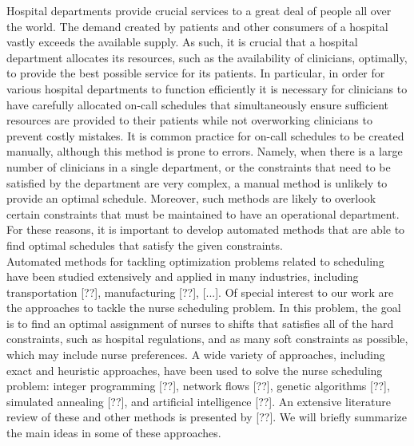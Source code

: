 Hospital departments provide crucial services to a great deal of people all over the world. The demand created by patients and other consumers of a hospital vastly exceeds the available supply. As such, it is crucial that a hospital department allocates its resources, such as the availability of clinicians, optimally, to provide the best possible service for its patients. In particular, in order for various hospital departments to function efficiently it is necessary for clinicians to have carefully allocated on-call schedules that simultaneously ensure sufficient resources are provided to their patients while not overworking clinicians to prevent costly mistakes. It is common practice for on-call schedules to be created manually, although this method is prone to errors. Namely, when there is a large number of clinicians in a single department, or the constraints that need to be satisfied by the department are very complex, a manual method is unlikely to provide an optimal schedule. Moreover, such methods are likely to overlook certain constraints that must be maintained to have an operational department. For these reasons, it is important to develop automated methods that are able to find optimal schedules that satisfy the given constraints. \\


Automated methods for tackling optimization problems related to scheduling have been studied extensively and applied in many industries, including transportation [??], manufacturing [??], [...]. Of special interest to our work are the approaches to tackle the nurse scheduling problem. In this problem, the goal is to find an optimal assignment of nurses to shifts that satisfies all of the hard constraints, such as hospital regulations, and as many soft constraints as possible, which may include nurse preferences. A wide variety of approaches, including exact and heuristic approaches, have been used to solve the nurse scheduling problem: integer programming [??], network flows [??], genetic algorithms [??], simulated annealing [??], and artificial intelligence [??]. An extensive literature review of these and other methods is presented by [??]. We will briefly summarize the main ideas in some of these approaches. \\

